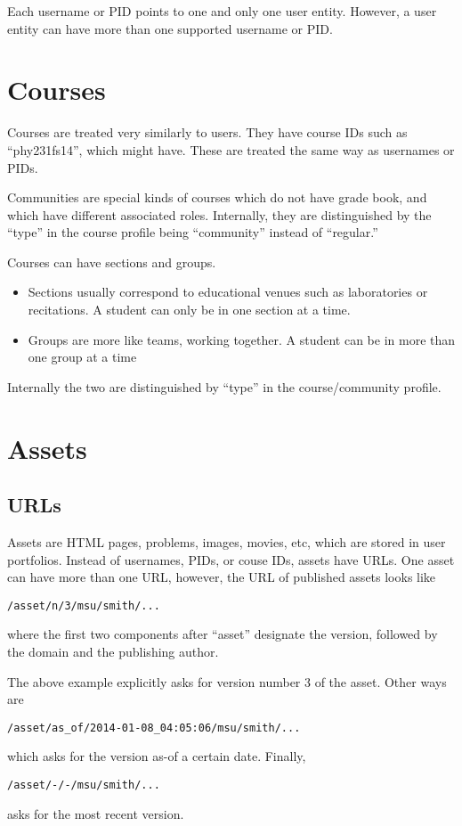 Each username or PID points to one and only one user entity. However, a user entity can have more than one supported username or PID.
\section{Courses}
Courses are treated very similarly to users. They have course IDs such as ``phy231fs14'', which might have. These are treated the same way as usernames or PIDs.

Communities are special kinds of courses which do not have grade book, and which have different associated roles. Internally, they are distinguished by the ``type'' in the course profile being ``community'' instead of ``regular.''

Courses can have sections and groups.
\begin{itemize}
\item Sections usually correspond to educational venues such as laboratories or recitations. A student can only be in one section at a time.
\item Groups are more like teams, working together. A student can be in more than one group at a time
\end{itemize}
Internally the two are distinguished by ``type'' in the course/community profile.
\section{Assets}\label{assets}
\subsection{URLs}
Assets are HTML pages, problems, images, movies, etc, which are stored in user portfolios.
Instead of usernames, PIDs, or couse IDs, assets have URLs. One asset can have more than one URL, however, the URL of published assets looks like
\begin{center}
{\tt /asset/n/3/msu/smith/...}
\end{center}
where the first two components after ``asset'' designate the version, followed by the domain and the publishing author.

The above example explicitly asks for version number 3 of the asset. Other ways are
\begin{center}
{\tt /asset/as\_of/2014-01-08\_04:05:06/msu/smith/...}
\end{center}
which asks for the version as-of a certain date. Finally,
\begin{center}
{\tt /asset/-/-/msu/smith/...}
\end{center}
asks for the most recent version.


